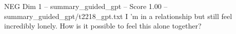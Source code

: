 \begin{textsample}{NEG Dim 1 – summary\_guided\_gpt – Score 1.00 – summary\_guided\_gpt/t2218\_gpt.txt}  \label{ex:f1_neg_026}
I ’m in a relationship but still feel incredibly lonely.
How is it possible to feel this alone together?

\end{textsample}
